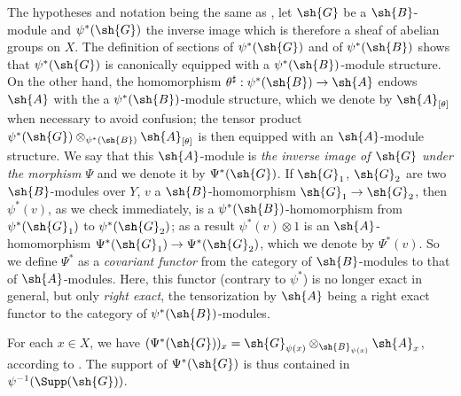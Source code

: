 \begin{env}[4.3.1]
\label{0.4.3.1}
The hypotheses and notation being the same as , let $\sh{G}$ be
a $\sh{B}$-module and $\psi^*(\sh{G})$ the inverse image  which
is therefore a sheaf of abelian groups on $X$. The definition of sections of
$\psi^*(\sh{G})$ and of $\psi^*(\sh{B})$  shows that
$\psi^*(\sh{G})$ is canonically equipped with a $\psi^*(\sh{B})$-module
structure. On the other hand, the homomorphism
$\theta^\sharp:\psi^*(\sh{B})\to\sh{A}$ endows $\sh{A}$ with the a
$\psi^*(\sh{B})$-module structure, which we denote by $\sh{A}_{[\theta]}$ when
necessary to avoid confusion; the tensor product
$\psi^*(\sh{G})\otimes_{\psi^*(\sh{B})}\sh{A}_{[\theta]}$ is then equipped with
an $\sh{A}$-module structure. We say that this $\sh{A}$-module is \emph{the
inverse image of $\sh{G}$ under the morphism $\Psi$}
and we denote it by $\Psi^*(\sh{G})$. If $\sh{G}_1$, $\sh{G}_2$ are two
$\sh{B}$-modules over $Y$, $v$ a $\sh{B}$-homomorphism $\sh{G}_1\to\sh{G}_2$,
then $\psi^*(v)$, as we check immediately, is a $\psi^*(\sh{B})$-homomorphism
from $\psi^*(\sh{G}_1)$ to $\psi^*(\sh{G}_2)$; as a result $\psi^*(v)\otimes 1$
is an $\sh{A}$-homomorphism $\Psi^*(\sh{G}_1)\to\Psi^*(\sh{G}_2)$, which we
denote by $\Psi^*(v)$. So we define $\Psi^*$ as a \emph{covariant functor} from
the category of $\sh{B}$-modules to that of $\sh{A}$-modules. Here, this functor
(contrary to $\psi^*$) is no longer exact in general, but only \emph{right
exact}, the tensorization by $\sh{A}$ being a right exact functor to the
category of $\psi^*(\sh{B})$-modules.

For each $x\in X$, we have
$(\Psi^*(\sh{G}))_x=\sh{G}_{\psi(x)}\otimes_{\sh{B}_{\psi(x)}}\sh{A}_x$,
according to . The support of $\Psi^*(\sh{G})$ is thus
contained in $\psi^{-1}(\Supp(\sh{G}))$.
\end{env}


